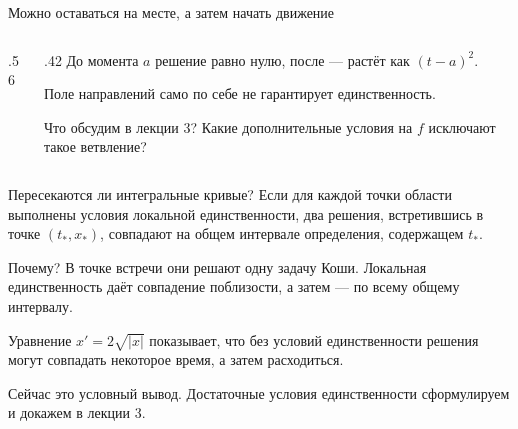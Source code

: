\documentclass[aspectratio=169,11pt]{beamer}
\begin{document}
\begin{frame}{Можно оставаться на месте, а затем начать движение}
  \begin{columns}[c]
    \begin{column}{.56\textwidth}
      \centering
    \end{column}
    \begin{column}{.42\textwidth}
      До момента $a$ решение равно нулю, после --- растёт как $(t-a)^2$.
      \medskip

      Поле направлений само по себе не гарантирует единственность.
      \begin{block}{Что обсудим в лекции 3?}
        Какие дополнительные условия на $f$ исключают такое ветвление?
      \end{block}
    \end{column}
  \end{columns}
\end{frame}

\begin{frame}{Пересекаются ли интегральные кривые?}
  Если для каждой точки области выполнены условия \alert{локальной единственности},
  два решения, встретившись в точке $(t_*,x_*)$, совпадают
  на общем интервале определения, содержащем $t_*$.
  \begin{block}{Почему?}
    В точке встречи они решают одну задачу Коши. Локальная единственность
    даёт совпадение поблизости, а затем --- по всему общему интервалу.
  \end{block}
  Уравнение $x'=2\sqrt{|x|}$ показывает, что без условий единственности
  решения могут совпадать некоторое время, а затем расходиться.
  \medskip

  Сейчас это условный вывод. Достаточные условия единственности
  сформулируем и докажем в лекции 3.
\end{frame}
\end{document}
